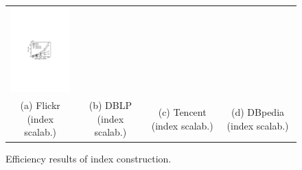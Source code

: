 \begin{figure}[htp]
\begin{tabular}{c c c c}
\begin{minipage}{3.76cm}
	\includegraphics[width=3.725cm]{figures/dbpedia-index}
  \end{minipage}
  \\
  \small (a) Flickr (index scalab.)
  &
  \small (b) DBLP (index scalab.)
  &
  \small (c) Tencent (index scalab.)
  &
  \small (d) DBpedia (index scalab.)
\end{tabular}
\caption{Efficiency results of index construction.}
\label{fig:exp-index}
\end{figure}



